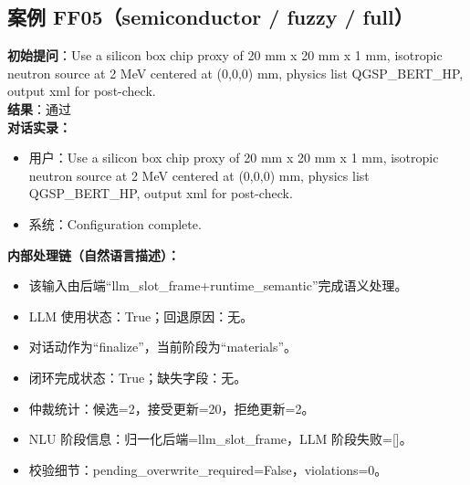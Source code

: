 \documentclass[11pt]{ctexart}
\begin{document}
\subsection{案例 FF05（semiconductor / fuzzy / full）}
\textbf{初始提问}：Use a silicon box chip proxy of 20 mm x 20 mm x 1 mm, isotropic neutron source at 2 MeV centered at (0,0,0) mm, physics list QGSP\_BERT\_HP, output xml for post-check.\\
\textbf{结果}：通过\\
\textbf{对话实录：}
\begin{itemize}
\item 用户：Use a silicon box chip proxy of 20 mm x 20 mm x 1 mm, isotropic neutron source at 2 MeV centered at (0,0,0) mm, physics list QGSP\_BERT\_HP, output xml for post-check.
\item 系统：Configuration complete.
\end{itemize}
\textbf{内部处理链（自然语言描述）：}
\begin{itemize}
\item 该输入由后端“llm\_slot\_frame+runtime\_semantic”完成语义处理。
\item LLM 使用状态：True；回退原因：无。
\item 对话动作为“finalize”，当前阶段为“materials”。
\item 闭环完成状态：True；缺失字段：无。
\item 仲裁统计：候选=2，接受更新=20，拒绝更新=2。
\item NLU 阶段信息：归一化后端=llm\_slot\_frame，LLM 阶段失败=[]。
\item 校验细节：pending\_overwrite\_required=False，violations=0。
\end{itemize}
\end{document}
